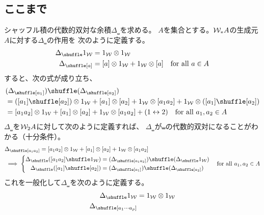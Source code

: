 {\subsection{ここまで}\label{s2:ここまで} %
	シャッフル積の代数的双対な余積$\Delta_\shuffle$を求める。
	$A$を集合とする。${{\mathcal{W}}}_*A$の生成元$A$に対する$\Delta_\shuffle$の作用を
	次のように定義する。
	\begin{equation*}\begin{split}
		\Delta_\shuffle1_\W &= 1_\W\otimes 1_\W \\
		\Delta_\shuffle[a] &= [a]\otimes1_\W + 1_\W\otimes[a]
		\quad\text{for all } a\in A
	\end{split}\end{equation*}
	すると、次の式が成り立ち、
	\begin{equation*}\begin{split}
		&(\Delta_\shuffle[a_1])\shuffle(\Delta_\shuffle[a_2]) \\
		&= ([a_1]\shuffle[a_2])\otimes1_\W + [a_1]\otimes[a_2] 
		+ 1_\W\otimes[a_1a_2] + 1_\W\otimes([a_1]\shuffle[a_2]) \\
		&= [a_1a_2]\otimes1_\W + [a_1]\otimes[a_2] + 1_\W\otimes[a_1a_2]
		+ (1\swap2) \quad\text{for all } a_1,a_2\in A
	\end{split}\end{equation*}
	$\Delta_\shuffle$を${{\mathcal{W}}}_2A$に対して次のように定義すれば、
	$\Delta_\shuffle$が$\shuffle$の代数的双対になることがわかる（十分条件）。
	\begin{equation*}\begin{split}
		& \Delta_\shuffle[a_1a_2]
		= [a_1a_2]\otimes1_\W + [a_1]\otimes[a_2] + 1_\W\otimes[a_1a_2] \\
		& \implies \left\{\begin{split}
			\Delta_\shuffle([a_1a_2]\shuffle 1_\W)
			&= (\Delta_\shuffle[a_1a_2])\shuffle(\Delta_\shuffle 1_\W) \\
			\Delta_\shuffle([a_1]\shuffle[a_2])
			&= (\Delta_\shuffle[a_1])\shuffle(\Delta_\shuffle[a_2]) \\
		\end{split}\right. \quad\text{for all } a_1,a_2\in A
	\end{split}\end{equation*}
	これを一般化して$\Delta_\shuffle$を次のように定義する。
	\begin{equation*}\begin{split}
		\Delta_\shuffle1_\W &= 1_\W\otimes 1_\W \\
		\Delta_\shuffle[a_1\cdots a_p]

\end{split}
\end{equation*}}
